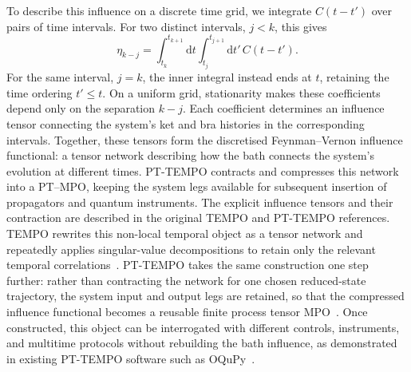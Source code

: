 To describe this influence on a discrete time grid, we integrate
\(C(t-t')\) over pairs of time intervals.
For two distinct intervals, \(j<k\), this gives
%
\begin{equation}
    \eta_{k-j}
    =
    \int_{t_k}^{t_{k+1}}\!\mathrm{d}t
    \int_{t_j}^{t_{j+1}}\!\mathrm{d}t'\,
    C(t-t').
    \label{eq:roadmap-feynman-vernon-influence}
\end{equation}
%
For the same interval, \(j=k\), the inner integral instead ends at
\(t\), retaining the time ordering \(t'\leq t\).
On a uniform grid, stationarity makes these coefficients depend
only on the separation \(k-j\).
Each coefficient determines an influence tensor connecting the system's ket and bra histories in the corresponding intervals.
Together, these tensors form the discretised Feynman--Vernon influence functional: a tensor network describing how the bath connects the system's evolution at different times.
PT-TEMPO contracts and compresses this network into a PT--MPO, keeping the system legs available for subsequent insertion of propagators and quantum instruments.
The explicit influence tensors and their contraction are described in the original TEMPO and PT-TEMPO references.
TEMPO rewrites this non-local temporal object as a tensor network and repeatedly applies singular-value decompositions to retain only the relevant temporal correlations~\cite{strathearn2018tempo}.
PT-TEMPO takes the same construction one step further: rather than contracting the network for one chosen reduced-state trajectory, the system input and output legs are retained, so that the compressed influence functional becomes a reusable finite process tensor MPO~\cite{jorgensen2019pttempo}.
Once constructed, this object can be interrogated with different controls, instruments, and multitime protocols without rebuilding the bath influence, as demonstrated in existing PT-TEMPO software such as OQuPy~\cite{fux2024oqupy}.
%
